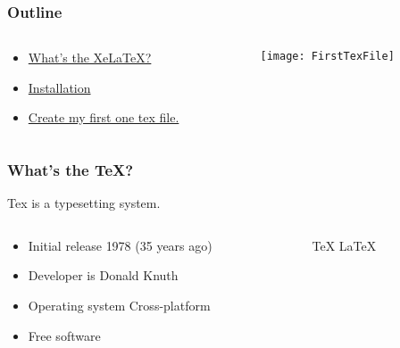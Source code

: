 	\begin{frame}[label=title]%
    	\titlepage\end{frame} 


	\begin{frame}%
		\frametitle{Outline}
		\begin{columns}
			\begin{column}{6cm}		
				\begin{itemize}
					\item \hyperlink{introduction}{What's the XeLaTeX?}
					\item \hyperlink{install}{Installation}
					\item \hyperlink{first}{Create my first one tex file.}
				\end{itemize}
			\end{column}
			
			\begin{column}{6cm}
				\texttt{[image: FirstTexFile]}
			\end{column}
		\end{columns}	
	\end{frame}
		

	\begin{frame}[label=introduction]%
		\frametitle{What's the TeX?}
		Tex is a typesetting system.
		\begin{columns}
			\begin{column}{7cm}		
				\begin{itemize}
					\item {Initial release \alert{1978} (35 years ago) }
					\item {Developer is \alert{Donald Knuth}}
					\item {Operating system	\alert{Cross-platform}}
					\item {\alert{Free} software}
				\end{itemize}
			\end{column}
			\begin{column}{4cm}
				\TeX\newline
				\LaTeX\newline
				\LaTeXe\newline
				\XeTeX\newline
				\XeLaTeX
			\end{column}
		\end{columns}
	\end{frame}


